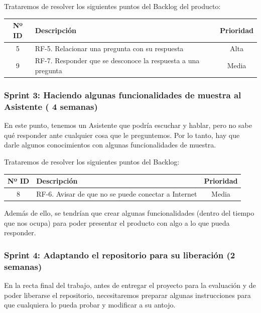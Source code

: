 Trataremos de resolver los siguientes puntos del Backlog del producto:
\begin{table}[H]
	\begin{tabularx}{\textwidth}{|c|X|c|}
		\hline
		{\cellcolor{mintgreen}} \textbf{Nº ID} & {\cellcolor{mintgreen}} \textbf{Descripción} & {\cellcolor{mintgreen}} \textbf{Prioridad} \\
		\hline
			5 & RF-5. Relacionar una pregunta con su respuesta & Alta \\
		\hline
			9 & RF-7. Responder que se desconoce la respuesta a una pregunta & Media \\
		\hline
	\end{tabularx}
\end{table}

\subsubsection{Sprint 3: Haciendo algunas funcionalidades de muestra al Asistente ( 4 semanas)}

En este punto, tenemos un Asistente que podría escuchar y hablar, pero no sabe qué responder ante cualquier cosa que le preguntemos. Por lo tanto, hay que darle algunos conocimientos con algunas funcionalidades de muestra.

Trataremos de resolver los siguientes puntos del Backlog:
\begin{table}[H]
	\begin{tabularx}{\textwidth}{|c|X|c|}
		\hline
		{\cellcolor{mintgreen}} \textbf{Nº ID} & {\cellcolor{mintgreen}} \textbf{Descripción} & {\cellcolor{mintgreen}} \textbf{Prioridad} \\
		\hline
			8 & RF-6. Avisar de que no se puede conectar a Internet & Media \\
		\hline
	\end{tabularx}
\end{table}

Además de ello, se tendrían que crear algunas funcionalidades (dentro del tiempo que nos ocupa) para poder presentar el producto con algo a lo que pueda responder.

\subsubsection{Sprint 4: Adaptando el repositorio para su liberación (2 semanas)}

En la recta final del trabajo, antes de entregar el proyecto para la evaluación y de poder liberarse el repositorio, necesitaremos preparar algunas instrucciones para que cualquiera lo pueda probar y modificar a su antojo.

